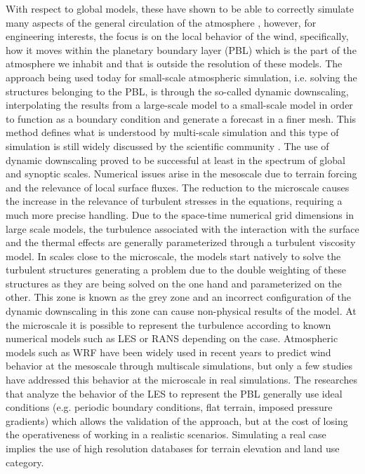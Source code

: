 With respect to global models, these have shown to be able to correctly simulate many aspects of the general circulation of the atmosphere \citep{stocker2013climate}, however, for engineering interests, the focus is on the local behavior of the wind, specifically, how it moves within the planetary boundary layer (PBL) which is the part of the atmosphere we inhabit and that is outside the resolution of these models.
The approach being used today for small-scale atmospheric simulation, i.e. solving the structures belonging to the PBL, is through the so-called dynamic downscaling, interpolating the results from a large-scale model to a small-scale model in order to function as a boundary condition and generate a forecast in a finer mesh. This method defines what is understood by multi-scale simulation and this type of simulation is still widely discussed by the scientific community \citep{Arnold2010}. The use of dynamic downscaling proved to be successful at least in the spectrum of global and synoptic scales. Numerical issues arise in the mesoscale due to terrain forcing and the relevance of local surface fluxes. The reduction to the microscale causes the increase in the relevance of turbulent stresses in the equations, requiring a much more precise handling. Due to the space-time numerical grid dimensions in large scale models, the turbulence associated with the interaction with the surface and the thermal effects are generally parameterized through a turbulent viscosity model. In scales close to the microscale, the models start natively to solve the turbulent structures generating a problem due to the double weighting of these structures as they are being solved on the one hand and parameterized on the other. This zone is known as the grey zone \citep{Wyngaard2004} and an incorrect configuration of the dynamic downscaling in this zone can cause non-physical results of the model. At the microscale it is possible to represent the turbulence according to known numerical models such as LES or RANS depending on the case. Atmospheric models such as WRF have been widely used in recent years to predict wind behavior at the mesoscale through multiscale simulations, but only a few studies have addressed this behavior at the microscale in real simulations. The researches that analyze the behavior of the LES to represent the PBL generally use ideal conditions (e.g. periodic boundary conditions, flat terrain, imposed pressure gradients) which allows the validation of the approach, but at the cost of losing the operativeness of working in a realistic scenarios. Simulating a real case implies the use of high resolution databases for terrain elevation and land use category.

